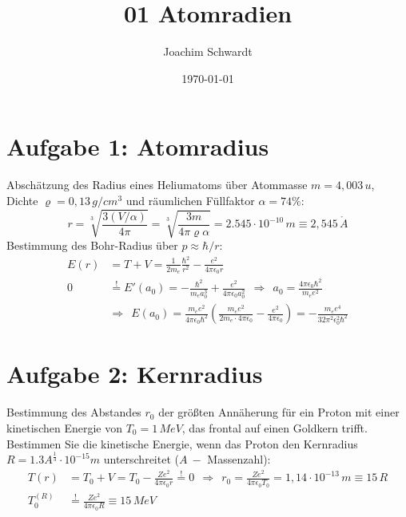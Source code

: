 \documentclass[a4paper,12pt]{article}
\newcommand{\kla}{}
\begin{document}
\title{01 Atomradien}
\author{Joachim Schwardt}
\date{\today}
\maketitle

\section*{Aufgabe 1: Atomradius}
Abschätzung des Radius eines Heliumatoms über Atommasse $m=4,003\, u$, Dichte $\varrho = 0,13\, g/cm^3$ und räumlichen Füllfaktor $\alpha = 74\%$:
$$r=\sqrt[3]{\frac{3(V/\alpha)}{4\pi}}=\sqrt[3]{\frac{3m}{4\pi\varrho\alpha}}= 2.545\cdot 10^{-10}\, m\equiv 2,545\, \mathring{A}$$
Bestimmung des Bohr-Radius über $p\approx \hbar/r$:
\begin{align*}
E(r)&=T+V=\frac{1}{2m_e}\frac{\hbar^2}{r^2}-\frac{e^2}{4\pi\epsilon_0r}\\
0&\overset {!}{=}E'(a_0)=-\frac{\hbar^2}{m_ea_0^3}+\frac{e^2}{4\pi\epsilon_0a_0^2}\ \ \Rightarrow\ \ a_0 = \frac{4\pi\epsilon_0\hbar^2}{m_ee^2}\\
&\Rightarrow\ \ E(a_0)=\frac{m_ee^2}{4\pi\epsilon_0\hbar^2}\kla\left( {\frac{m_ee^2}{2m_e\cdot 4\pi\epsilon_0}-\frac{e^2}{4\pi\epsilon_0}} \right) =-\frac{m_ee^4}{32\pi^2\epsilon_0^2\hbar^2}
\end{align*}

\section*{Aufgabe 2: Kernradius}
Bestimmung des Abstandes $r_0$ der größten Annäherung für ein Proton mit einer kinetischen Energie von $T_0= 1\, MeV$, das frontal auf einen Goldkern trifft. Bestimmen Sie die kinetische Energie, wenn das Proton den Kernradius $R = 1.3A^{\frac{1}{3}}\cdot 10^{-15}m$ unterschreitet ($A\ -$ Massenzahl):
\begin{align*}
T(r)&=T_0+V=T_0-\frac{Ze^2}{4\pi\epsilon_0 r}\overset{!}{=}0\ \ \Rightarrow\ \ r_0 = \frac{Ze^2}{4\pi\epsilon_0 T_0}=1,14\cdot 10^{-13}\, m\equiv 15\, R\\
T_0^{(R)}&\overset{!}{=}\frac{Ze^2}{4\pi\epsilon_0 R}\equiv 15\, MeV
\end{align*}
\end{document}
